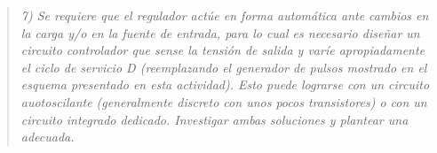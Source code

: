 \begin{quote} \textit{7) Se requiere que el regulador actúe en forma automática ante cambios en la carga y/o en la fuente de entrada, para lo cual es necesario diseñar un circuito controlador que sense la tensión de salida y varíe apropiadamente el ciclo de servicio D (reemplazando el generador de pulsos mostrado en el esquema presentado en esta actividad). Esto puede lograrse con un circuito auotoscilante (generalmente discreto con unos pocos transistores) o con un circuito integrado dedicado. Investigar ambas soluciones y plantear una adecuada.}
\end{quote}
